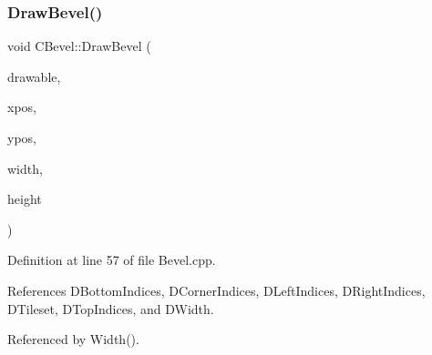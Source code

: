 \subsubsection{\texorpdfstring{Draw\+Bevel()}{DrawBevel()}}
{\footnotesize\ttfamily void C\+Bevel\+::\+Draw\+Bevel (\begin{DoxyParamCaption}\item[{Gdk\+Drawable $\ast$}]{drawable,  }\item[{gint}]{xpos,  }\item[{gint}]{ypos,  }\item[{gint}]{width,  }\item[{gint}]{height }\end{DoxyParamCaption})}



Definition at line 57 of file Bevel.\+cpp.



References D\+Bottom\+Indices, D\+Corner\+Indices, D\+Left\+Indices, D\+Right\+Indices, D\+Tileset, D\+Top\+Indices, and D\+Width.



Referenced by Width().


